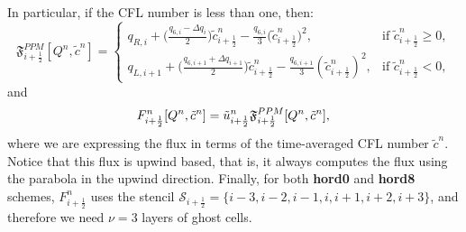 In particular, if the CFL number is less than one, then:
\begin{equation}
	\label{chp-sec-flux:numerical-flux4}
        \mathfrak{F}_{i+\frac{1}{2}}^{PPM}[Q^n,\tilde{c}^n]  =  
    	\begin{cases}
        q_{R,i} +
        \big(\frac{{q_{6,i} - \Delta q_i}}{2}\big){\tilde{c}_{{i+\frac{1}{2}}}^n}
	- \frac{q_{6,i}}{3}{(\tilde{c}_{{i+\frac{1}{2}}}^n})^2, 
	& \text{if } \tilde{c}_{i+\frac{1}{2}}^n \geq 0,\\
	q_{L,i+1} +
	\big(\frac{q_{6,i+1} + \Delta q_{i+1}}{2}\big){\tilde{c}_{{i+\frac{1}{2}}}^n}
	-\frac{q_{6,i+1}}{3}({\tilde{c}_{{i+\frac{1}{2}}}^n})^2,
	& \text{if } \tilde{c}_{i+\frac{1}{2}}^n<0,
    	\end{cases}
\end{equation}
and
\begin{equation}
	\label{chp-sec-flux:numerical-flux5}
         {F}_{i+\frac{1}{2}}^{n}[Q^n,\tilde{c}^n] = 
         {\tilde{u}}_{i+\frac{1}{2}}^n\mathfrak{F}_{i+\frac{1}{2}}^{PPM}[Q^n,\tilde{c}^n],\\
\end{equation}
where we are expressing the flux in terms of the time-averaged CFL number $\tilde{c}^n$.
Notice that this flux is upwind based, that is, it always computes the flux using the parabola in the upwind direction.
Finally, for both \textbf{hord0} and \textbf{hord8} schemes, $F_{i+\frac{1}{2}}^n$ uses the stencil
$\mathcal{S}_{i+\frac{1}{2}} = \{i-3,i-2,i-1,i,i+1,i+2,i+3\}$, and therefore we need $\nu=3$ layers of ghost cells.

